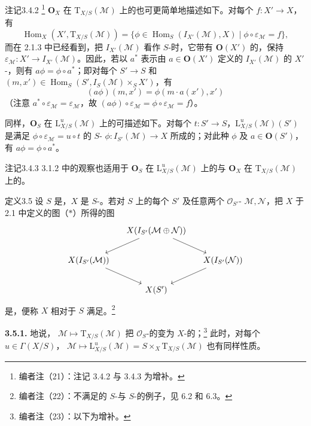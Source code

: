 \begin{SGAresult}{注记}{3.4.2}
\footnote{编者注（21）：注记 3.4.2 与 3.4.3 为增补。} $\mathbf O_X$ 在 $\mathrm T_{X/S}(\mathcal M)$ 上的也可更简单地描述如下。对每个 $f:X'\to X$，有
\[
\operatorname{Hom}_X(X',\mathrm T_{X/S}(\mathcal M))
=\{\phi\in\operatorname{Hom}_S(I_{X'}(\mathcal M),X)\mid\phi\circ\varepsilon_{\mathcal M}=f\},
\]
而在 2.1.3 中已经看到，把 $I_{X'}(\mathcal M)$ 看作 $S$-时，它带有 $\mathbf O(X')$ 的，保持 $\varepsilon_{\mathcal M}:X'\to I_{X'}(\mathcal M)$。因此，若以 $a^*$ 表示由 $a\in\mathbf O(X')$ 定义的 $I_{X'}(\mathcal M)$ 的 $X'$-，则有 $a\phi=\phi\circ a^*$；即对每个 $S'\to S$ 和 $(m,x')\in\operatorname{Hom}_S(S',I_S(\mathcal M)\times_S X')$，有
\[
(a\phi)(m,x')=\phi(m\cdot a(x'),x')
\]
（注意 $a^*\circ\varepsilon_{\mathcal M}=\varepsilon_{\mathcal M}$，故 $(a\phi)\circ\varepsilon_{\mathcal M}=\phi\circ\varepsilon_{\mathcal M}=f$）。

同样，$\mathbf O_S$ 在 $\mathrm L^u_{X/S}(\mathcal M)$ 上的可描述如下。对每个 $t:S'\to S$，$\mathrm L^u_{X/S}(\mathcal M)(S')$ 是满足 $\phi\circ\varepsilon_{\mathcal M}=u\circ t$ 的 $S$- $\phi:I_{S'}(\mathcal M)\to X$ 所成的；对此种 $\phi$ 及 $a\in\mathbf O(S')$，有 $a\phi=\phi\circ a^*$。
\end{SGAresult}
\begin{SGAresult}{注记}{3.4.3}
3.1.2 中的观察也适用于 $\mathbf O_S$ 在 $\mathrm L^u_{X/S}(\mathcal M)$ 上的与 $\mathbf O_X$ 在 $\mathrm T_{X/S}(\mathcal M)$ 上的。
\end{SGAresult}
\begin{SGAresult}{定义}{3.5}
设 $S$ 是，$X$ 是 $S$-。若对 $S$ 上的每个 $S'$ 及任意两个 $\mathcal O_{S'}$- $\mathcal M,\mathcal N$，把 $X$ 于 2.1 中定义的图（$*$）所得的图
\[
\begin{tikzcd}[column sep=small]
&X(I_{S'}(\mathcal M\oplus\mathcal N))\arrow[dl]\arrow[dr]&\\
X(I_{S'}(\mathcal M))\arrow[dr]&&X(I_{S'}(\mathcal N))\arrow[dl]\\
&X(S')&
\end{tikzcd}
\]
是，便称 $X$ 相对于 $S$ 满足。\footnote{编者注（22）：不满足的 $S$-与 $S$-的例子，见 6.2 和 6.3。}
\end{SGAresult}
\textbf{3.5.1.} 地说， $\mathcal M\mapsto\mathrm T_{X/S}(\mathcal M)$ 把 $\mathcal O_S$-的变为 $X$-的；\footnote{编者注（23）：以下为增补。} 此时，对每个 $u\in\Gamma(X/S)$， $\mathcal M\mapsto\mathrm L^u_{X/S}(\mathcal M)=S\times_X\mathrm T_{X/S}(\mathcal M)$ 也有同样性质。

